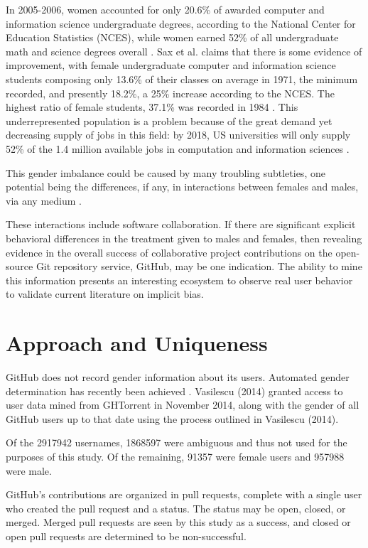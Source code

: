 \documentclass{sigplanconf}
\begin{document}
In 2005-2006, women accounted for only 20.6\% of awarded computer and information
science undergraduate degrees, according to the National Center for Education
Statistics (NCES), while women earned 52\% of all undergraduate
math and science degrees overall \citep{genderdiversitycomputing}.
Sax et al. claims that there is some evidence of improvement, with female
undergraduate computer and information science students composing only 13.6\% of
their classes on average in 1971, the minimum recorded, and presently 18.2\%, a
25\% increase according to the NCES. The highest ratio of female students,
37.1\% was recorded in 1984 \citep{evolutionofwomen}.
This underrepresented population is a problem because of the great demand yet
decreasing supply of jobs in this field: by 2018, US universities will only
supply 52\% of the 1.4 million available jobs in computation and information
sciences \citep{genderdiversitycomputing}.

This gender imbalance could be caused by many troubling subtleties,
one potential being the differences, if any, in interactions
between females and males, via any medium \citep{implicitbias}.

These interactions include software 
collaboration. If there are significant explicit behavioral differences in the
treatment given to males and females, then revealing evidence in the overall success of
collaborative project contributions on the open-source Git
repository service, GitHub, may be one indication. The ability to mine this information
presents an interesting ecosystem to observe real user behavior to validate current
literature on implicit bias.

\section{Approach and Uniqueness}

GitHub does not record gender information about its users. Automated gender
determination has recently been achieved \cite{VasilescuIWC13}.
Vasilescu (2014) granted access to user data mined from GHTorrent in November 2014,
along with the gender of all GitHub users up to that date using the process
outlined in Vasilescu (2014).

Of the \num{2917942} usernames, \num{1868597} were ambiguous and thus
not used for the purposes of this study. Of the remaining, \num{91357} were
female users and \num{957988} were male.

GitHub's contributions are organized in pull requests, complete with a single
user who created the pull request and a status. The status may be open, closed,
or merged. Merged pull requests are seen by this study as a success, and closed
or open pull requests are determined to be non-successful.
\end{document}
